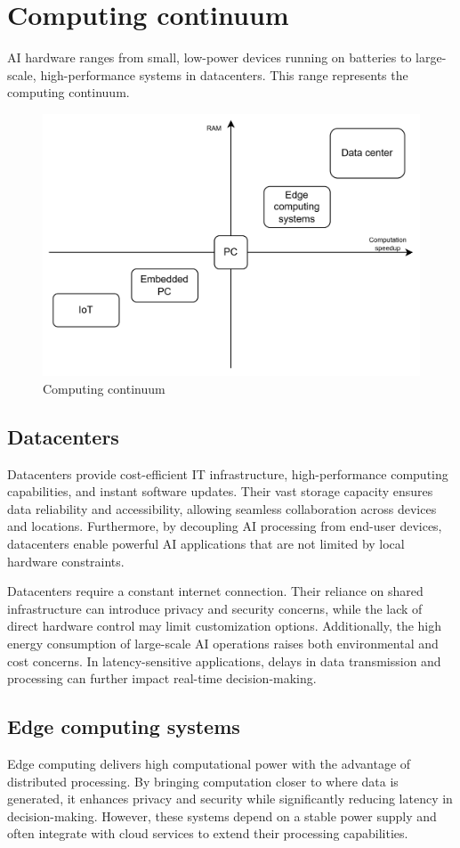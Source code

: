 \section{Computing continuum}

AI hardware ranges from small, low-power devices running on batteries to large-scale, high-performance systems in datacenters.
This range represents the computing continuum. 
\begin{figure}[H]
    \centering
    \includegraphics[width=0.5\linewidth]{images/eeai2.png}
    \caption{Computing continuum}
\end{figure}

\subsection{Datacenters}
Datacenters provide cost-efficient IT infrastructure, high-performance computing capabilities, and instant software updates.
Their vast storage capacity ensures data reliability and accessibility, allowing seamless collaboration across devices and locations. 
Furthermore, by decoupling AI processing from end-user devices, datacenters enable powerful AI applications that are not limited by local hardware constraints.

Datacenters require a constant internet connection. 
Their reliance on shared infrastructure can introduce privacy and security concerns, while the lack of direct hardware control may limit customization options. 
Additionally, the high energy consumption of large-scale AI operations raises both environmental and cost concerns. 
In latency-sensitive applications, delays in data transmission and processing can further impact real-time decision-making.

\subsection{Edge computing systems}
Edge computing delivers high computational power with the advantage of distributed processing. 
By bringing computation closer to where data is generated, it enhances privacy and security while significantly reducing latency in decision-making. 
However, these systems depend on a stable power supply and often integrate with cloud services to extend their processing capabilities.

